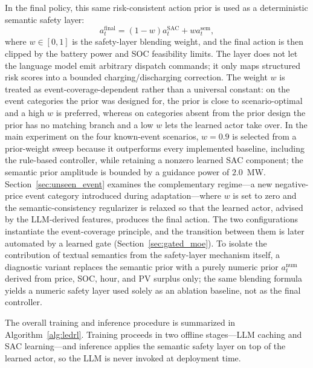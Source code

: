 \documentclass{ieeeaccess}
\begin{document}
In the final policy, this same risk-consistent action prior is used as a deterministic semantic safety layer:
\begin{equation}
a^{\mathrm{final}}_t =
(1-w)a^{\mathrm{SAC}}_t + w a^{\mathrm{sem}}_t,
\end{equation}
where $w \in [0,1]$ is the safety-layer blending weight, and the final action is then clipped by the battery power and SOC feasibility limits. The layer does not let the language model emit arbitrary dispatch commands; it only maps structured risk scores into a bounded charging/discharging correction. The weight $w$ is treated as event-coverage-dependent rather than a universal constant: on the event categories the prior was designed for, the prior is close to scenario-optimal and a high $w$ is preferred, whereas on categories absent from the prior design the prior has no matching branch and a low $w$ lets the learned actor take over. In the main experiment on the four known-event scenarios, $w=0.9$ is selected from a prior-weight sweep because it outperforms every implemented baseline, including the rule-based controller, while retaining a nonzero learned SAC component; the semantic prior amplitude is bounded by a guidance power of $2.0$~MW. Section~\ref{sec:unseen_event} examines the complementary regime---a new negative-price event category introduced during adaptation---where $w$ is set to zero and the semantic-consistency regularizer is relaxed so that the learned actor, advised by the LLM-derived features, produces the final action. The two configurations instantiate the event-coverage principle, and the transition between them is later automated by a learned gate (Section~\ref{sec:gated_moe}). To isolate the contribution of textual semantics from the safety-layer mechanism itself, a diagnostic variant replaces the semantic prior with a purely numeric prior $a^{\mathrm{num}}_t$ derived from price, SOC, hour, and PV surplus only; the same blending formula yields a numeric safety layer used solely as an ablation baseline, not as the final controller.

The overall training and inference procedure is summarized in Algorithm~\ref{alg:ledrl}. Training proceeds in two offline stages---LLM caching and SAC learning---and inference applies the semantic safety layer on top of the learned actor, so the LLM is never invoked at deployment time.
\end{document}
